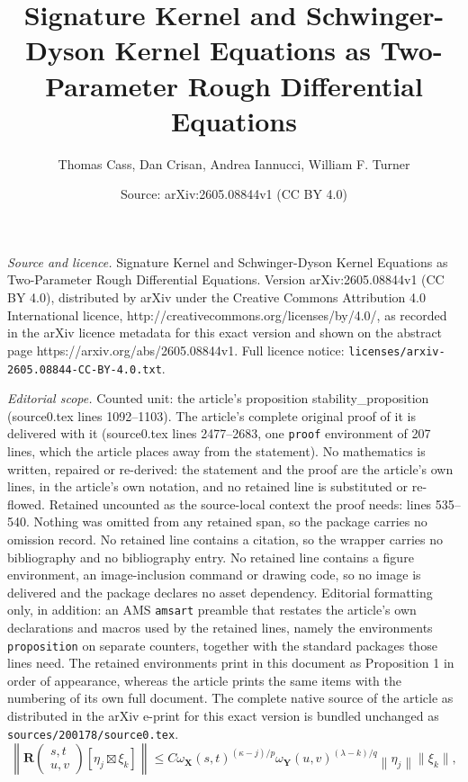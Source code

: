 \documentclass[10pt,a4paper]{amsart}
\title{Signature Kernel and Schwinger-Dyson Kernel Equations as Two-Parameter Rough Differential Equations}
\author{Thomas Cass, Dan Crisan, Andrea Iannucci, William F. Turner}
\date{Source: arXiv:2605.08844v1 (CC BY 4.0)}
\begin{document}
\maketitle

\noindent\emph{Source and licence.} Signature Kernel and Schwinger-Dyson Kernel Equations as Two-Parameter Rough Differential Equations. Version arXiv:2605.08844v1 (CC BY 4.0), distributed by arXiv under the Creative Commons Attribution 4.0 International licence, http://creativecommons.org/licenses/by/4.0/, as recorded in the arXiv licence metadata for this exact version and shown on the abstract page https://arxiv.org/abs/2605.08844v1. Full licence notice: \texttt{licenses/arxiv-2605.08844-CC-BY-4.0.txt}.\par\smallskip

\noindent\textit{Editorial scope.} Counted unit: the article's proposition stability\_proposition (source0.tex lines 1092--1103). The article's complete original proof of it is delivered with it (source0.tex lines 2477--2683, one \texttt{proof} environment of 207 lines, which the article places away from the statement). No mathematics is written, repaired or re-derived: the statement and the proof are the article's own lines, in the article's own notation, and no retained line is substituted or re-flowed.  Retained uncounted as the source-local context the proof needs: lines 535--540.  Nothing was omitted from any retained span, so the package carries no omission record.  No retained line contains a citation, so the wrapper carries no bibliography and no bibliography entry.  No retained line contains a figure environment, an image-inclusion command or drawing code, so no image is delivered and the package declares no asset dependency.  Editorial formatting only, in addition: an AMS \texttt{amsart} preamble that restates the article's own declarations and macros used by the retained lines, namely the environments \texttt{proposition} on separate counters, together with the standard packages those lines need.  The retained environments print in this document as Proposition 1 in order of appearance, whereas the article prints the same items with the numbering of its own full document.  The complete native source of the article as distributed in the arXiv e-print for this exact version is bundled unchanged as \texttt{sources/200178/source0.tex}.
\begin{equation}\label{remainder_remainder_norm}
\left\| \mathbf{R} \begin{pmatrix} s,t \\ u,v \end{pmatrix} [\eta_j \boxtimes \xi_k] \right\| \leq C \omega_{\mathbf{X}}\left(
s,t\right)  ^{\left(  \kappa-j\right)  /p} \omega_{\mathbf{Y}}\left(
u,v\right)  ^{\left(  \lambda-k\right)  /q}\left \| \eta_{j}%
\right \| \| \xi_k \|,
\end{equation}
\end{document}
